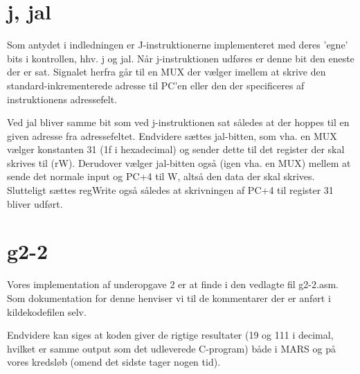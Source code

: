 \documentclass[10pt,a4paper,danish]{article}
\begin{document}
\section{j, jal}
Som antydet i indledningen er J-instruktionerne implementeret med deres 'egne'
bits i kontrollen, hhv. j og jal. Når j-instruktionen udføres er denne bit den
eneste der er sat. Signalet herfra går til en MUX der vælger imellem at skrive
den standard-inkrementerede adresse til PC'en eller den der specificeres af
instruktionens adressefelt. 

Ved jal bliver samme bit som ved j-instruktionen sat således at der hoppes til
en given adresse fra adressefeltet. Endvidere sættes jal-bitten, som vha. en MUX vælger
konstanten 31 (1f i hexadecimal) og sender dette til det register
der skal skrives til (rW). Derudover vælger jal-bitten også (igen vha. en MUX) mellem
at sende det normale input og PC+4 til W, altså den data der skal skrives.
Slutteligt sættes regWrite også således at skrivningen af PC+4 til register 31
bliver udført.

\section{g2-2}
Vores implementation af underopgave 2 er at finde i den vedlagte fil g2-2.asm.
Som dokumentation for denne henviser vi til de kommentarer der er anført i
kildekodefilen selv. 

Endvidere kan siges at koden giver de rigtige resultater (19 og 111 i decimal,
hvilket er samme output som det udleverede C-program) både i MARS og på vores
kredsløb (omend det sidste tager nogen tid).
\end{document}
